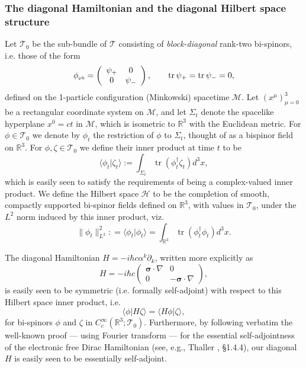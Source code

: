 \documentclass[12pt]{article}
\theoremstyle{definition}
\DeclareMathOperator{\tr}{tr}
\numberwithin{equation}{section}
\newcommand{\beq}{\begin{equation}}
\newcommand{\eeq}{\end{equation}}
\newcommand{\p}{\partial}
\newcommand{\cH}{{\mathcal H}}
\newcommand{\cM}{{\mathcal M}}
\newcommand{\cT}{\mathcal{T}}
\newcommand{\siV}{\boldsymbol{\sigma}}
\newcommand{\phiPH}{{\phi_{\mbox{\rm\tiny ph}}}}
\newcommand{\Rset}{{\mathbb R}}
\newcommand{\ze}{\zeta}
\newcommand{\al}{\alpha}
\newcommand{\Si}{\Sigma}
\newcommand{\nab}{\nabla}
\begin{document}
\subsubsection{The diagonal Hamiltonian and the diagonal  Hilbert space structure}
 Let $\cT_0$ be the sub-bundle of  $\cT$ consisting of {\em block-diagonal} rank-two bi-spinors, i.e. those of the form
\beq
\phiPH = \left(\begin{array}{cc} \psi_+ & 0 \\ 0 & \psi_- \end{array}\right),\qquad \tr \psi_+ = \tr \psi_- = 0,
\eeq
defined on the 1-particle configuration (Minkowski) spacetime $\cM$. 
 Let $(x^\mu)_{\mu=0}^3$ be a rectangular coordinate system on $\cM$, and let $\Si_t$ denote the spacelike hyperplane $x^0 = ct$ 
in $\cM$, which is isometric to $\Rset^3$ with the Euclidean metric.
 For $\phi \in \cT_0$ we denote by $\phi_t$ the restriction of $\phi$ to $\Si_t$, thought of as a bispinor field on $\Rset^3$.
   For $\phi,\ze \in \cT_0$ we define their inner product at time $t$ to be
\beq\label{def:innerprod}
\langle \phi_t | \ze_t \rangle := \int_{\Si_t} \tr\left( \phi_t^\dag \ze_t \right) d^3x,
\eeq
which is easily seen to satisfy the requirements of being a complex-valued inner product. 
 We define the Hilbert space $\cH$ to be the completion of smooth, compactly supported bi-spinor fields defined on $\Rset^3$, 
with values in $\cT_0$, under the $L^2$ norm induced by this inner product, viz.
\beq
\|\phi_t\|_{L^2}^2 : = \langle\phi_t | \phi_t\rangle = \int_{\Rset^3} \tr\left( \phi_t^\dag\phi_t \right) d^3x.
\eeq

 The diagonal Hamiltonian $H = -i\hbar c\al^k\p_k$, written more explicitly as
\beq 
\label{DIRACphotonHAMILTONIAN}
H = -i\hbar c\begin{pmatrix} \siV\cdot\nab  & 0 \\
                                        0 & - \siV\cdot\nab
\end{pmatrix},
\eeq
is easily seen to be symmetric (i.e. formally self-adjoint) with respect to this Hilbert space inner product, i.e.
\beq 
\langle \phi | H\zeta \rangle = \langle H\phi| \zeta \rangle,
\eeq
for bi-spinors $\phi$ and $\zeta$ in $C^\infty_c(\Rset^3;\cT_0)$.
 Furthermore, by following verbatim the well-known proof --- using Fourier 
transform --- for the essential self-adjointness of the electronic free Dirac Hamiltonian (see, e.g., Thaller \cite{ThallerBOOK}, \S1.4.4),
our diagonal $H$ is easily seen to be essentially self-adjoint.
\end{document}
